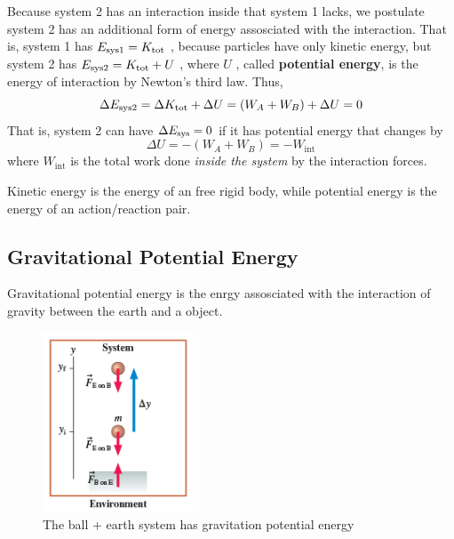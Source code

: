 Because system 2 has an interaction inside that system 1 lacks, we
postulate system 2 has an additional form of energy assosciated with the
interaction.  That is, system 1 has
$
    E_{\mathrm{sys} 1} = K_{\mathrm{tot}}
$%
, because particles have only kinetic energy, but system 2 has
$
    E_{\mathrm{sys} 2} = K_{\mathrm{tot}} + U
$%
, where
$
    U
$%
, called \textbf{potential energy}, is the energy of interaction by
Newton's third law.  Thus,
\begin{equation}
    \Delta E_{\mathrm{sys} 2} = \Delta K_{\mathrm{tot}} + \Delta U = \left(W_A + W_B
    \right) + \Delta U = 0
\end{equation}
That is, system 2 can have
$
    \Delta E_{\mathrm{sys}} = 0
$ if it has potential energy that changes by
\begin{equation}
    \Delta U = -\left(W_A + W_B\right) = -W_\mathrm{int}
\end{equation}
where
$
    W_\mathrm{int}
$ is the total work done \emph{inside the system} by the interaction
forces.
\begin{remark}
    Kinetic energy is the energy of an free rigid body, while potential
    energy is the energy of an action/reaction pair.
\end{remark}

\subsection{Gravitational Potential Energy}

Gravitational potential energy is the enrgy assosciated with the
interaction of gravity between the earth and a object.

\begin{figure}
    \centering
    \includegraphics[width=0.4\textwidth]{../figures/ball-earth-potential-energy.png}
    \caption{The ball + earth system has gravitation potential energy}%
    \label{fig:ball-earth-model}
\end{figure}

